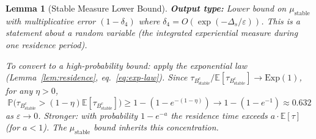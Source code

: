 \documentclass[11pt]{article}
\newtheorem{lemma}{Lemma}
\newcommand{\eps}{\varepsilon}
\newcommand{\Ds}{\Delta_s}
\newcommand{\Bstable}{B_{\mathrm{stable}}}
\begin{document}
\begin{lemma}[Stable Measure Lower Bound]
\medskip
\textbf{Output type:}
Lower bound on $\mu_{\mathrm{stable}}$ with multiplicative error
$(1 - \delta_4)$ where $\delta_4 = O(\exp(-\Ds/\eps))$.
This is a statement about a random variable (the integrated
experiential measure during one residence period).

To convert to a high-probability bound: apply the exponential law
(Lemma~\ref{lem:residence}, eq.~\eqref{eq:exp-law}). Since
$\tau_{\Bstable^c} / \mathbb{E}[\tau_{\Bstable^c}] \to \mathrm{Exp}(1)$,
for any $\eta > 0$,
\[
  \mathbb{P}\bigl(\tau_{\Bstable^c}
  > (1-\eta) \mathbb{E}[\tau_{\Bstable^c}]\bigr)
  \geq 1 - (1 - e^{-(1-\eta)}) \to 1 - (1 - e^{-1}) \approx 0.632
\]
as $\eps \to 0$. Stronger: with probability $1 - e^{-a}$ the residence
time exceeds $a \cdot \mathbb{E}[\tau]$ (for $a < 1$). The
$\mu_{\mathrm{stable}}$ bound inherits this concentration.
\end{lemma}
\end{document}
